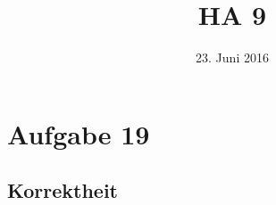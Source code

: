 



\title{HA 9}
\date{23. Juni 2016}

\maketitle

\section*{Aufgabe 19}
\label{sec:Aufgabe 19}

\subsection{Korrektheit}
\label{sub:Korrektheit}

